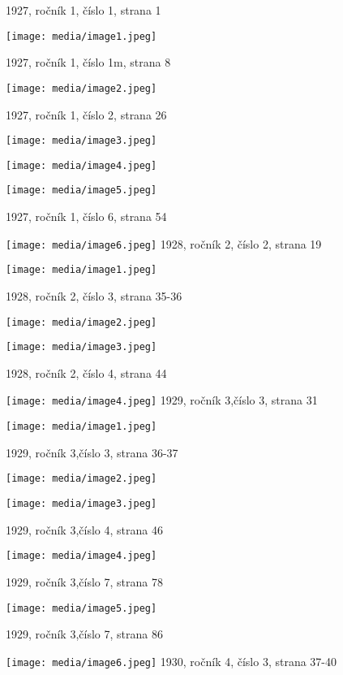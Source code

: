 1927, ročník 1, číslo 1, strana 1

\texttt{[image: media/image1.jpeg]}

1927, ročník 1, číslo 1m, strana 8

\texttt{[image: media/image2.jpeg]}

1927, ročník 1, číslo 2, strana 26

\texttt{[image: media/image3.jpeg]}

\texttt{[image: media/image4.jpeg]}

\texttt{[image: media/image5.jpeg]}

1927, ročník 1, číslo 6, strana 54

\texttt{[image: media/image6.jpeg]}
1928, ročník 2, číslo 2, strana 19

\texttt{[image: media/image1.jpeg]}

1928, ročník 2, číslo 3, strana 35-36

\texttt{[image: media/image2.jpeg]}

\texttt{[image: media/image3.jpeg]}

1928, ročník 2, číslo 4, strana 44

\texttt{[image: media/image4.jpeg]}
1929, ročník 3,číslo 3, strana 31

\texttt{[image: media/image1.jpeg]}

1929, ročník 3,číslo 3, strana 36-37

\texttt{[image: media/image2.jpeg]}

\texttt{[image: media/image3.jpeg]}

1929, ročník 3,číslo 4, strana 46

\texttt{[image: media/image4.jpeg]}

1929, ročník 3,číslo 7, strana 78

\texttt{[image: media/image5.jpeg]}

1929, ročník 3,číslo 7, strana 86

\texttt{[image: media/image6.jpeg]}
1930, ročník 4, číslo 3, strana 37-40

